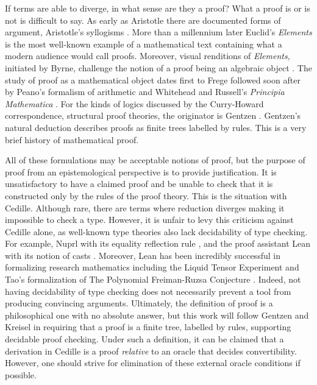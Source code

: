 If terms are able to diverge, in what sense are they a proof?
What a proof is or is not is difficult to say.
As early as Aristotle there are documented forms of argument, Aristotle's syllogisms \cite{aristotle}.
More than a millennium later Euclid's \textit{Elements} is the most well-known example of a mathematical text containing what a modern audience would call proofs.
Moreover, visual renditions of \textit{Elements}, initiated by Byrne, challenge the notion of a proof being an algebraic object \cite{byrne}.
The study of proof as a mathematical object dates first to Frege \cite{frege1879} followed soon after by Peano's formalism of arithmetic \cite{peano1889} and Whitehead and Russell's \textit{Principia Mathematica} \cite{whitehead}.
For the kinds of logics discussed by the Curry-Howard correspondence, structural proof theories, the originator is Gentzen \cite{gentzen1935_i,gentzen1935_ii}.
Gentzen's natural deduction describes proofs as finite trees labelled by rules.
This is a very brief history of mathematical proof.

All of these formulations may be acceptable notions of proof, but the purpose of proof from an epistemological perspective is to provide justification.
It is unsatisfactory to have a claimed proof and be unable to check that it is constructed only by the rules of the proof theory.
This is the situation with Cedille.
Although rare, there are terms where reduction diverges making it impossible to check a type.
However, it is unfair to levy this criticism against Cedille alone, as well-known type theories also lack decidability of type checking.
For example, Nuprl with its equality reflection rule \cite{allen2000}, and the proof assistant Lean with its notion of casts \cite{moura2021}.
Moreover, Lean has been incredibly successful in formalizing research mathematics including the Liquid Tensor Experiment \cite{liquid_tensor_experiment} and Tao's formalization of The Polynomial Freiman-Ruzsa Conjecture \cite{tao2024_pfr}.
Indeed, not having decidability of type checking does not necessarily prevent a tool from producing convincing arguments.
Ultimately, the definition of proof is a philosophical one with no absolute answer, but this work will follow Gentzen and Kreisel in requiring that a proof is a finite tree, labelled by rules, supporting decidable proof checking.
Under such a definition, it can be claimed that a derivation in Cedille is a proof \textit{relative} to an oracle that decides convertibility.
However, one should strive for elimination of these external oracle conditions if possible.

